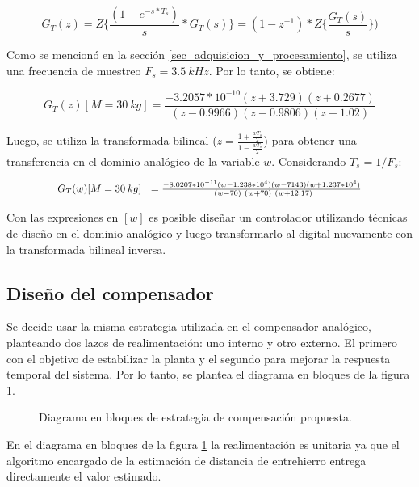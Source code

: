 \begin{equation*}
	G_T(z)=Z\{\frac{(1-e^{-s*T_s})}{s}*G_T(s)\}=(1-z^{-1})*Z\{\frac{G_T(s)}{s}\})
\end{equation*}

 Como se mencionó en la sección \ref{sec_adquisicion_y_procesamiento}, se utiliza una frecuencia de muestreo  $F_s=3.5\:kHz$. Por lo tanto, se obtiene:

\begin{equation} 
	G_T(z)[M=30\:kg] =\frac{-3.2057*10^{-10}(z+3.729)(z+0.2677)}{(z-0.9966)(z-0.9806) (z-1.02)}
\end{equation}

Luego, se utiliza la transformada bilineal ($z=\frac{1+\frac{wT_s}{2}}{1-\frac{wT_s}{2}}$) para obtener una transferencia en el dominio analógico de la variable $w$. Considerando $T_s=1/F_s$:

\begin{equation} \label{eq_Gtotal_w_m30}
	\resizebox{.8\hsize}{!}
	{
		$G_T(w)[M=30\:kg]\ \ =\frac{-8.0207*10^{-11}(w-1.238*10^4)(w-7143)(w+1.237*10^4)}{\ (w-70)\ (w+70)\ (w+12.17)}$
	}
\end{equation}


Con las expresiones en $[w]$ es posible diseñar un controlador utilizando técnicas de diseño en el dominio analógico y luego transformarlo al digital nuevamente con la transformada bilineal inversa.



\subsection{Diseño del compensador}

Se decide usar la misma estrategia utilizada en el compensador analógico, planteando dos lazos de realimentación: uno interno y otro externo. El primero con el objetivo de estabilizar la planta y el segundo para mejorar la respuesta temporal del sistema. Por lo tanto, se plantea el diagrama en bloques de la figura \ref{fig:diag-en-bloques-comp_digital}.

\begin{figure}[H]
	\centering
	\scalebox{0.8}{}
	\caption{Diagrama en bloques de estrategia de compensación propuesta.}	\label{fig:diag-en-bloques-comp_digital}
\end{figure}

En el diagrama en bloques de la figura \ref{fig:diag-en-bloques-comp_digital} la realimentación es unitaria ya que el algoritmo encargado de la estimación de distancia de entrehierro entrega directamente el valor estimado.

